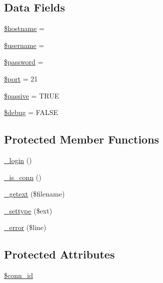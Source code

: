 \subsection*{Data Fields}
\begin{DoxyCompactItemize}
\item 
\hyperlink{class_c_i___f_t_p_a8bf9ffb42ed554b203b55377d1fc9aa4}{\$hostname} = \textquotesingle{}\textquotesingle{}
\item 
\hyperlink{class_c_i___f_t_p_a0eb82aa5f81cf845de4b36cd653c42cf}{\$username} = \textquotesingle{}\textquotesingle{}
\item 
\hyperlink{class_c_i___f_t_p_a607686ef9f99ea7c42f4f3dd3dbb2b0d}{\$password} = \textquotesingle{}\textquotesingle{}
\item 
\hyperlink{class_c_i___f_t_p_aa0787efab4b22e8a212882f3409d4c77}{\$port} = 21
\item 
\hyperlink{class_c_i___f_t_p_a9fb61732ea9189fa2be5574ad3576d9c}{\$passive} = T\+R\+U\+E
\item 
\hyperlink{class_c_i___f_t_p_a85ae3e64cd40e9564adceb010085e9dd}{\$debug} = F\+A\+L\+S\+E
\end{DoxyCompactItemize}
\subsection*{Protected Member Functions}
\begin{DoxyCompactItemize}
\item 
\hyperlink{class_c_i___f_t_p_a95562e7b8a41561f4b0b525d9c7fe701}{\+\_\+login} ()
\item 
\hyperlink{class_c_i___f_t_p_af20c08e4b61fe028e032b388cd73936a}{\+\_\+is\+\_\+conn} ()
\item 
\hyperlink{class_c_i___f_t_p_ab06ef33f96f03cafbb8f2bb6d695ef1f}{\+\_\+getext} (\$filename)
\item 
\hyperlink{class_c_i___f_t_p_aacd9d6628615078d8df9aab1fe70e391}{\+\_\+settype} (\$ext)
\item 
\hyperlink{class_c_i___f_t_p_ac618e7d56614851d2c54aa096e1bcace}{\+\_\+error} (\$line)
\end{DoxyCompactItemize}
\subsection*{Protected Attributes}
\begin{DoxyCompactItemize}
\item 
\hyperlink{class_c_i___f_t_p_a16c23f1dcbfed2f2759f5e54f604106d}{\$conn\+\_\+id}
\end{DoxyCompactItemize}


